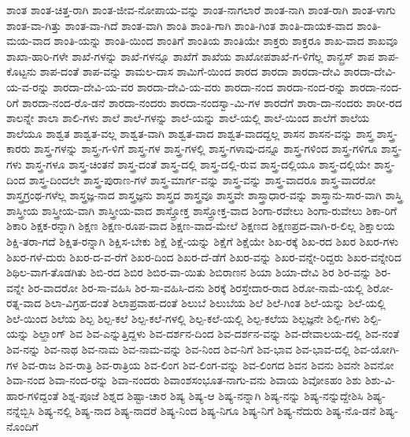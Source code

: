 {ಶಾಂತ
ಶಾಂತ-ಚಿತ್ತ-ರಾಗಿ
ಶಾಂತ-ಜೀವ-ನೋಪಾಯ-ವನ್ನು
ಶಾಂತ-ನಾಗಲಾರೆ
ಶಾಂತ-ನಾಗಿ
ಶಾಂತ-ರಾಗಿ
ಶಾಂತ-ಳಾಗು
ಶಾಂತ-ವಾ-ಗಿತ್ತು
ಶಾಂತ-ವಾ-ಗಿದೆ
ಶಾಂತ-ವಾಗಿ
ಶಾಂತಿ
ಶಾಂತಿ-ಗಾಗಿ
ಶಾಂತಿ-ಗಿಂತ
ಶಾಂತಿ-ದಾಯಕ-ವಾದ
ಶಾಂತಿ-ಮಯ-ವಾದ
ಶಾಂತಿ-ಯನ್ನು
ಶಾಂತಿ-ಯಿಂದ
ಶಾಂತಿಗೆ
ಶಾಂತಿಯ
ಶಾಂತಿಯೇ
ಶಾಕ್ತರು
ಶಾಕ್ತರೂ
ಶಾಖ-ವಾದ
ಶಾಖವೂ
ಶಾಖಾ-ಹಾರಿ-ಗಳೇ
ಶಾಖೆ-ಗಳನ್ನು
ಶಾಖೆ-ಗಳನ್ನೂ
ಶಾಖೆಗೆ
ಶಾಖೆಯ
ಶಾಖೋಪಶಾಖೆ-ಗ-ಳಿಗೆಲ್ಲ
ಶಾನ್ಬ್ರಸ್
ಶಾಪ
ಶಾಪ-ಕೊಟ್ಟನು
ಶಾಪ-ದಂತೆ
ಶಾಪ-ವನ್ನು
ಶಾಮಲ-ದಾಸ
ಶಾಮಿಗೆ-ಯಿಂದ
ಶಾರದ
ಶಾರದಾ
ಶಾರದಾ-ದೇವಿ
ಶಾರದಾ-ದೇವಿ-ಯ-ವ-ರನ್ನು
ಶಾರದಾ-ದೇವಿ-ಯ-ವರ
ಶಾರದಾ-ದೇವಿ-ಯ-ವರು
ಶಾರದಾ-ನಂದ
ಶಾರದಾ-ನಂದ-ರನ್ನು
ಶಾರದಾ-ನಂದ-ರಿಗೆ
ಶಾರದಾ-ನಂದ-ರೊ-ಡನೆ
ಶಾರದಾ-ನಂದರು
ಶಾರದಾ-ನಂದಸ್ವಾ-ಮಿ-ಗಳ
ಶಾರದೆಗೆ
ಶಾರಾ-ದಾ-ನಂದರು
ಶಾರೀ-ರದ
ಶಾಲನ್ನೇ
ಶಾಲಾ
ಶಾಲಿ-ಗಳು
ಶಾಲೆ
ಶಾಲೆ-ಗಳನ್ನು
ಶಾಲೆ-ಯನ್ನು
ಶಾಲೆ-ಯಲ್ಲಿ
ಶಾಲೆ-ಯಿಂದ
ಶಾಲೆಗೆ
ಶಾಲೆಯ
ಶಾಲೆಯೂ
ಶಾಶ್ವತ
ಶಾಶ್ವತ-ವಲ್ಲ
ಶಾಶ್ವತ-ವಾಗಿ
ಶಾಶ್ವತ-ವಾದ
ಶಾಶ್ವತ-ವಾದದ್ದಲ್ಲ
ಶಾಸನ
ಶಾಸನ-ವನ್ನು
ಶಾಸ್ತ್ರ
ಶಾಸ್ತ್ರ-ಕಾರರು
ಶಾಸ್ತ್ರ-ಗಳನ್ನು
ಶಾಸ್ತ್ರ-ಗ-ಳಿಗೆ
ಶಾಸ್ತ್ರ-ಗಳ
ಶಾಸ್ತ್ರ-ಗಳಲ್ಲಿ
ಶಾಸ್ತ್ರ-ಗಳಾವು-ದನ್ನೂ
ಶಾಸ್ತ್ರ-ಗಳಿಂದ
ಶಾಸ್ತ್ರ-ಗಳಿಗೂ
ಶಾಸ್ತ್ರ-ಗಳು
ಶಾಸ್ತ್ರ-ಗಳೂ
ಶಾಸ್ತ್ರ-ಚಿಂತನೆ
ಶಾಸ್ತ್ರ-ದಂತೆ
ಶಾಸ್ತ್ರ-ದಲ್ಲಿ
ಶಾಸ್ತ್ರ-ದಲ್ಲಿ-ರುವ
ಶಾಸ್ತ್ರ-ದಲ್ಲಿಯೂ
ಶಾಸ್ತ್ರ-ದಲ್ಲಿಯೇ
ಶಾಸ್ತ್ರ-ದಿಂದ
ಶಾಸ್ತ್ರ-ದಿಂದಲೇ
ಶಾಸ್ತ್ರ-ಪುರಾಣ-ಗಳೆ
ಶಾಸ್ತ್ರ-ಮಾರ್ಗ-ವನ್ನು
ಶಾಸ್ತ್ರ-ವನ್ನು
ಶಾಸ್ತ್ರ-ವಾದರೂ
ಶಾಸ್ತ್ರ-ವಾದರೋ
ಶಾಸ್ತ್ರಗ್ರಂಥ-ಗಳೆಲ್ಲ
ಶಾಸ್ತ್ರಜ್ಞ-ನಾದ
ಶಾಸ್ತ್ರಜ್ಞನು
ಶಾಸ್ತ್ರದ
ಶಾಸ್ತ್ರವೂ
ಶಾಸ್ತ್ರವೇ
ಶಾಸ್ತ್ರಾಧಾರ-ವನ್ನು
ಶಾಸ್ತ್ರಾನು-ಸಾರ-ವಾಗಿ
ಶಾಸ್ತ್ರಿ
ಶಾಸ್ತ್ರೀಯ
ಶಾಸ್ತ್ರೀಯ-ವಾಗಿ
ಶಾಸ್ತ್ರೀಯ-ವಾದ
ಶಾಸ್ತ್ರೋಕ್ತ
ಶಾಸ್ತ್ರೋಕ್ತ-ವಾದ
ಶಿಂಗಾ-ರವೇಲು
ಶಿಂಗಾ-ರುವೇಲು
ಶಿಕಾ-ರಿಗೆ
ಶಿಕಾರಿ
ಶಿಕ್ಷಕ-ರನ್ನಾಗಿ
ಶಿಕ್ಷಣ
ಶಿಕ್ಷಣ-ರೂಪ-ವಾದ
ಶಿಕ್ಷಣ-ವಾದ-ಮೇಲೆ
ಶಿಕ್ಷಣದ
ಶಿಕ್ಷಣಪ್ರದ-ವಾಗಿ-ರ-ಲಿಲ್ಲ
ಶಿಕ್ಷಾಲಯ
ಶಿಕ್ಷಿ-ತರಾ-ಗದೆ
ಶಿಕ್ಷಿತ-ರನ್ನಾಗಿ
ಶಿಕ್ಷಿಸ-ಬೇಕು
ಶಿಕ್ಷೆ
ಶಿಕ್ಷೆ-ಯನ್ನು
ಶಿಕ್ಷೆಗೆ
ಶಿಕ್ಷೆಯೇ
ಶಿಖ-ರಕ್ಕೆ
ಶಿಖ-ರದ
ಶಿಖರ
ಶಿಖರ-ಗಳು
ಶಿಖರ-ಗಳೆ-ದುರು
ಶಿಖರ-ದ-ವ-ರೆಗೆ
ಶಿಖರ-ದಿಂದ
ಶಿಖರ-ದೆ-ಡೆಗೆ
ಶಿಖರ-ವನ್ನು
ಶಿಖರ-ವನ್ನೇ-ರಿದ್ದರು
ಶಿಖರ-ವನ್ನೇರಿದ
ಶಿಥಿಲ-ವಾಗ-ತೊಡಗಿತು
ಶಿಬಿ-ರದ
ಶಿಬಿರ
ಶಿಬಿರ-ವಾ-ಯಿತು
ಶಿಬಿರಾಣನ
ಶಿಯಾ
ಶಿಯಾ-ದೇವಿ
ಶಿರ
ಶಿರ-ವನ್ನು
ಶಿರ-ವನ್ನೇ
ಶಿರ-ವಾದರೋ
ಶಿರ-ಸಾ-ವಹಿಸಿ
ಶಿರ-ಸಾ-ವಹಿಸಿ-ದನು
ಶಿರಕ್ಕೆ
ಶಿರಸ್ತೇದಾರ-ರಾದ
ಶಿರೋ-ನಾಮೆ-ಯಲ್ಲಿ
ಶಿರೋ-ರತ್ನ-ವಾದ
ಶಿಲಾ-ವಿಗ್ರಹ-ದಂತೆ
ಶಿಲಾಪ್ರವಾಹ-ದಂತೆ
ಶಿಲುಬೆ
ಶಿಲುಬೆಯ
ಶಿಲೆ
ಶಿಲೆ-ಗಿಂತ
ಶಿಲೆ-ಯನ್ನು
ಶಿಲೆ-ಯಲ್ಲಿ
ಶಿಲೆ-ಯಿಂದ
ಶಿಲೆಯ
ಶಿಲ್ಪ
ಶಿಲ್ಪ-ಕಲೆ
ಶಿಲ್ಪ-ಕಲೆ-ಗಳಲ್ಲಿ
ಶಿಲ್ಪ-ಕಲೆ-ಯಲ್ಲಿ
ಶಿಲ್ಪ-ಕಲೆಯ
ಶಿಲ್ಪಜ್ಞನೇ
ಶಿಲ್ಪಿ-ಗಳು
ಶಿಲ್ಪಿ-ಯನ್ನು
ಶಿಲ್ಹಾಂಗ್
ಶಿವ
ಶಿವ-ಎನ್ನುತ್ತಿದ್ದಳು
ಶಿವ-ದರ್ಶನ-ದಿಂದ
ಶಿವ-ದರ್ಶನ-ವನ್ನು
ಶಿವ-ದೇವಾಲಯ-ದಲ್ಲಿ
ಶಿವ-ನಂತೆ
ಶಿವ-ನನ್ನು
ಶಿವ-ನಾಥ
ಶಿವ-ನಾಮ
ಶಿವ-ನಾಮ-ವನ್ನು
ಶಿವ-ನಿಂದ
ಶಿವ-ನಿಗೆ
ಶಿವ-ಭಾವ
ಶಿವ-ಭಾವ-ದಲ್ಲಿ
ಶಿವ-ಯೋಗಿ-ಗಳ
ಶಿವ-ರಾಜ
ಶಿವ-ರಾತ್ರಿ
ಶಿವ-ರಾತ್ರಿಯ
ಶಿವ-ಲಿಂಗ
ಶಿವ-ಲಿಂಗ-ವನ್ನು
ಶಿವ-ಲಿಂಗದ
ಶಿವನ
ಶಿವನು
ಶಿವನೇ
ಶಿವನೋ
ಶಿವಾ-ನಂದ
ಶಿವಾ-ನಂದ-ರನ್ನು
ಶಿವಾ-ನಂದರು
ಶಿವಾಂಶಸಂಭೂತ-ನಾಗು-ವನು
ಶಿವಾಯ
ಶಿವೋಽಹಂ
ಶಿಶು
ಶಿಶು-ವಿ-ಹಾರ-ಗಳಿದ್ದಂತೆ
ಶಿಶ್ನ-ಪೂಜೆ
ಶಿಶ್ನದ
ಶಿಷ್ಟಾ-ಚಾರ
ಶಿಷ್ಯ
ಶಿಷ್ಯ-ಆ
ಶಿಷ್ಯ-ನನ್ನಾಗಿ
ಶಿಷ್ಯ-ನನ್ನು
ಶಿಷ್ಯ-ನನ್ನುದ್ದೇಶಿಸಿ
ಶಿಷ್ಯ-ನನ್ನೆಬ್ಬಿಸಿ
ಶಿಷ್ಯ-ನಲ್ಲಿ
ಶಿಷ್ಯ-ನಾದ
ಶಿಷ್ಯ-ನಾದರೆ
ಶಿಷ್ಯ-ನಿಂದ
ಶಿಷ್ಯ-ನಿಗೂ
ಶಿಷ್ಯ-ನಿಗೆ
ಶಿಷ್ಯ-ನೆದುರು
ಶಿಷ್ಯ-ನೊ-ಡನೆ
ಶಿಷ್ಯ-ನೊಂದಿಗೆ
}
